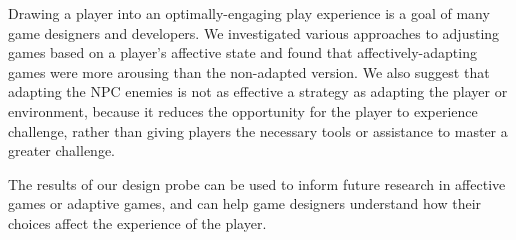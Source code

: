 
Drawing a player into an optimally-engaging play experience is a goal of many game designers and developers. We investigated various approaches to adjusting games based on a player's affective state and found that affectively-adapting games were more arousing than the non-adapted version. We also suggest that adapting the NPC enemies is not as effective a strategy as adapting the player or environment, because it reduces the opportunity for the player to experience challenge, rather than giving players the necessary tools or assistance to master a greater challenge.

The results of our design probe can be used to inform future research in affective games or adaptive games, and can help game designers understand how their choices affect the experience of the player.
